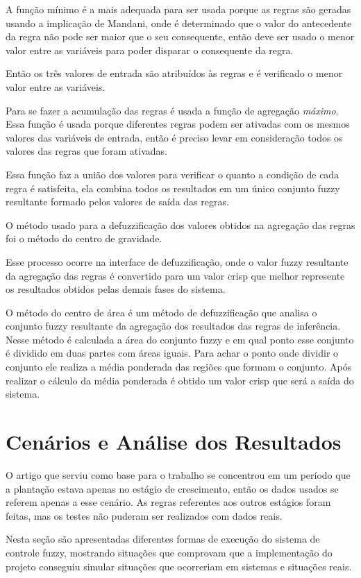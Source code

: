 \documentclass[
	article,			%
	11pt,				%
	oneside,			%
	a4paper,			%
	english,			%
	brazil,				%
	sumario=tradicional
	]{abntex2}
\begin{document}
\begin{multicols}{2}
A função mínimo é a mais adequada para ser usada porque as regras são geradas usando a implicação de Mandani, onde é determinado que o valor do antecedente da regra não pode ser maior que o seu consequente, então deve ser usado o menor valor entre as variáveis para poder disparar o consequente da regra.

Então os três valores de entrada são atribuídos às regras e é verificado o menor valor entre as variáveis.

Para se fazer a acumulação das regras é usada a função de agregação \textit{máximo}. Essa função é usada porque diferentes regras podem ser ativadas com os mesmos valores das variáveis de entrada, então é preciso levar em consideração todos os valores das regras que foram ativadas.

Essa função faz a união dos valores para verificar o quanto a condição de cada regra é satisfeita, ela combina todos os resultados em um único conjunto fuzzy resultante formado pelos valores de saída das regras.

O método usado para a defuzzificação dos valores obtidos na agregação das regras foi o método do centro de gravidade.

Esse processo ocorre na interface de defuzzificação, onde o valor fuzzy resultante da agregação das regras é convertido para um valor crisp que melhor represente os resultados obtidos pelas demais fases do sistema.

O método do centro de área é um método de defuzzificação que analisa o conjunto fuzzy resultante da agregação dos resultados das regras de inferência. Nesse método é calculada a área do conjunto fuzzy e em qual ponto esse conjunto é dividido em duas partes com áreas iguais. Para achar o ponto onde dividir o conjunto ele realiza a média ponderada das regiões que formam o conjunto. Após realizar o cálculo da média ponderada é obtido um valor crisp que será a saída do sistema.


\section{Cenários e Análise dos Resultados}

O artigo que serviu como base para o trabalho se concentrou em um período que a plantação estava apenas no estágio de crescimento, então os dados usados se referem apenas a esse cenário. As regras referentes aos outros estágios foram feitas, mas os testes não puderam ser realizados com dados reais.

Nesta seção são apresentadas diferentes formas de execução do sistema de controle fuzzy, mostrando situações que comprovam que a implementação do projeto conseguiu simular situações que ocorreriam em sistemas e situações reais.


\end{multicols}
\end{document}

